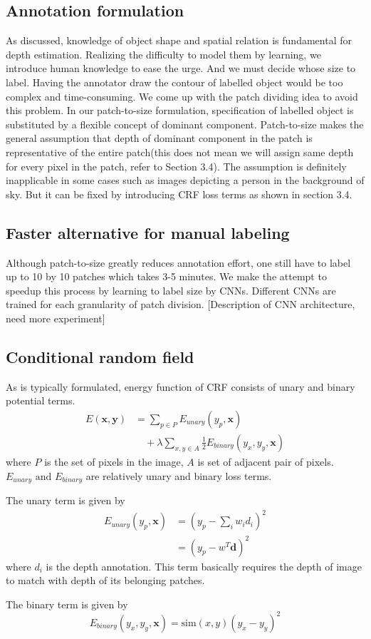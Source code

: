 \documentclass[10pt,twocolumn,letterpaper]{article}
\begin{document}
\subsection{Annotation formulation}
As discussed, knowledge of object shape and spatial relation is fundamental for depth estimation. Realizing the difficulty to model them by learning, we introduce human knowledge to ease the urge. And we must decide whose size to label. Having the annotator draw the contour of labelled object would be too complex and time-consuming. We come up with the patch dividing idea to avoid this problem. In our patch-to-size formulation, specification of labelled object is substituted by a flexible concept of dominant component. Patch-to-size makes the general assumption that depth of dominant component in the patch is representative of the entire patch(this does not mean we will assign same depth for every pixel in the patch, refer to Section 3.4). The assumption is definitely inapplicable in some cases such as images depicting a person in the background of sky. But it can be fixed by introducing CRF loss terms as shown in section 3.4.
\subsection{Faster alternative for manual labeling}
Although patch-to-size greatly reduces annotation effort, one still have to label up to 10 by 10 patches which takes 3-5 minutes. We make the attempt to speedup this process by learning to label size by CNNs. Different CNNs are trained for each granularity of patch division. [Description of CNN architecture, need more experiment]
\subsection{Conditional random field}
As is typically formulated, energy function of CRF consists of unary and binary potential terms.
\begin{align}
E(\mathbf{x}, \mathbf{y}) &= \sum_{p \in P}E_{unary}(y_{p}, \mathbf{x}) \\ &\quad + \lambda \sum_{x, y \in A} \frac{1}{2} E_{binary}(y_x, y_y, \mathbf{x})
\end{align}
where $P$ is the set of pixels in the image, $A$ is set of adjacent pair of pixels. $E_{unary}\text{ and }E_{binary}$ are relatively unary and binary loss terms.
\par
The unary term is given by
\begin{align}
E_{unary}(y_{p}, \mathbf{x}) &= (y_p - \sum_i{w_i d_i})^2
\\ &=(y_p-w^T\mathbf{d})^2
\end{align}
where $d_i$ is the depth annotation. This term basically requires the depth of image to match with depth of its belonging patches.
\par
The binary term is given by
\begin{equation}
E_{binary}(y_x, y_y, \mathbf{x}) = \text{sim}(x, y) (y_x-y_y)^2
\end{equation}
\end{document}
